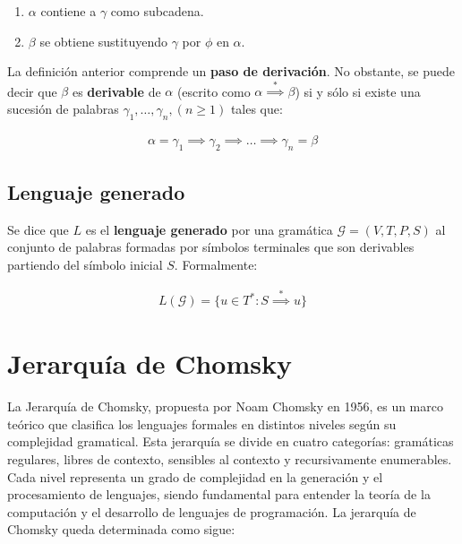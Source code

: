 \begin{enumerate}
    \item $\alpha$ contiene a $\gamma$ como subcadena.
    \item $\beta$ se obtiene sustituyendo $\gamma$ por $\phi$ en $\alpha$.
\end{enumerate}

La definición anterior comprende un \textbf{paso de derivación}. No obstante, se puede decir que $\beta$ es \textbf{derivable} de $\alpha$ (escrito como $\alpha \overset{*}{\implies} \beta$) si y sólo si existe una sucesión de palabras $\gamma_1,\ldots,\gamma_n, (n \geq 1)$ tales que:

\begin{align*}
    \alpha = \gamma_1 \implies \gamma_2 \implies \ldots \implies \gamma_n = \beta
\end{align*}

\subsection{Lenguaje generado}\label{subsection:gramaticalanguage}
Se dice que $L$ es el \textbf{lenguaje generado} por una gramática $\mathcal{G} = (V,T,P,S)$ al conjunto de palabras formadas por símbolos terminales que son derivables partiendo del símbolo inicial $S$. Formalmente:

\begin{align*}
    L(\mathcal{G}) = \lbrace u \in T^* : S \overset{*}{\implies} u \rbrace
\end{align*}

\section{Jerarquía de Chomsky}\label{section:chomsky}
La Jerarquía de Chomsky, propuesta por Noam Chomsky en 1956, es un marco teórico que clasifica los lenguajes formales en distintos niveles según su complejidad gramatical. Esta jerarquía se divide en cuatro categorías: gramáticas regulares, libres de contexto, sensibles al contexto y recursivamente enumerables. Cada nivel representa un grado de complejidad en la generación y el procesamiento de lenguajes, siendo fundamental para entender la teoría de la computación y el desarrollo de lenguajes de programación. La jerarquía de Chomsky queda determinada como sigue:

